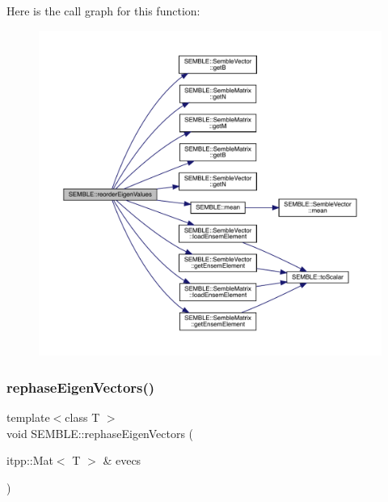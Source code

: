 Here is the call graph for this function\+:
\nopagebreak
\begin{figure}[H]
\begin{center}
\leavevmode
\includegraphics[width=350pt]{d7/dfd/namespaceSEMBLE_a688bf90b1c6ce1c1b6a28eb701eca973_cgraph}
\end{center}
\end{figure}
\mbox{\label{namespaceSEMBLE_a79d0a2c210a96269ba9cf04949eba1b8}} 
\subsubsection{\texorpdfstring{rephaseEigenVectors()}{rephaseEigenVectors()}\hspace{0.1cm}{\footnotesize\ttfamily [1/2]}}
{\footnotesize\ttfamily template$<$class T $>$ \\
void S\+E\+M\+B\+L\+E\+::rephase\+Eigen\+Vectors (\begin{DoxyParamCaption}\item[{itpp\+::\+Mat$<$ T $>$ \&}]{evecs }\end{DoxyParamCaption})}

